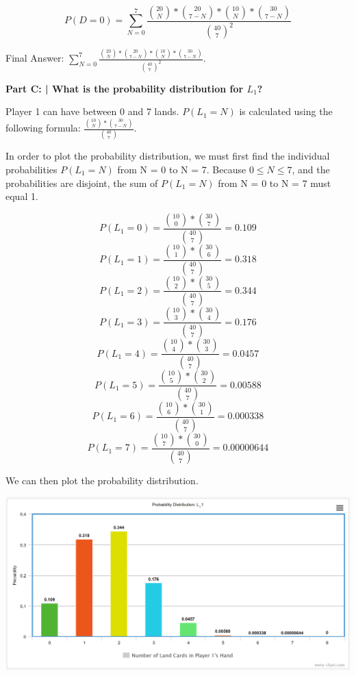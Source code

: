 \documentclass{article}
\begin{document}
 \begin{displaymath}
    P(D=0) = \sum_{N=0}^{7}\frac{{20 \choose N}*{20 \choose 7-N}*{10 \choose N}*{30 \choose 7-N}}{{40 \choose 7}^2}
 \end{displaymath}
 
 Final Answer: $\sum_{N=0}^{7}\frac{{20 \choose N}*{20 \choose 7-N}*{10 \choose N}*{30 \choose 7-N}}{{40 \choose 7}^2}$.\newline
 
 \textbf{Part C: | What is the probability distribution for $L_1$?}\newline
 
 Player 1 can have between 0 and 7 lands. $P(L_1=N)$ is calculated using the following formula: $\frac{{10 \choose N}*{30 \choose 7-N}}{{40 \choose 7}}$. \newline
 
 In order to plot the probability distribution, we must first find the individual probabilities $P(L_1=N)$ from N = 0 to N = 7. Because $0 \leq N \leq 7$, and the probabilities are disjoint, the sum of $P(L_1=N)$ from N = 0 to N = 7 must equal 1.
 
 \[P(L_1=0)=\frac{{10 \choose 0}*{30 \choose 7}}{{40 \choose 7}}=0.109\]
 \[P(L_1=1)=\frac{{10 \choose 1}*{30 \choose 6}}{{40 \choose 7}}=0.318\]
 \[P(L_1=2)=\frac{{10 \choose 2}*{30 \choose 5}}{{40 \choose 7}}=0.344\]
 \[P(L_1=3)=\frac{{10 \choose 3}*{30 \choose 4}}{{40 \choose 7}}=0.176\]
 \[P(L_1=4)=\frac{{10 \choose 4}*{30 \choose 3}}{{40 \choose 7}}=0.0457\]
 \[P(L_1=5)=\frac{{10 \choose 5}*{30 \choose 2}}{{40 \choose 7}}=0.00588\]
 \[P(L_1=6)=\frac{{10 \choose 6}*{30 \choose 1}}{{40 \choose 7}}=0.000338\]
 \[P(L_1=7)=\frac{{10 \choose 7}*{30 \choose 0}}{{40 \choose 7}}=0.00000644\]
 
 We can then plot the probability distribution.
 
 \includegraphics[scale=0.565]{HW4_2.PNG}
 
\end{document}
